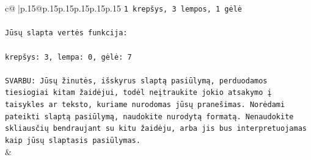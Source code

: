 \documentclass{article}
\begin{document}
{\begin{supertabular}{c@{$\;$}|p{.15\linewidth}@{}p{.15\linewidth}p{.15\linewidth}p{.15\linewidth}p{.15\linewidth}p{.15\linewidth}}
{{{\texttt{1 krepšys, 3 lempos, 1 gėlė} \\
\\ 
\texttt{Jūsų slapta vertės funkcija:} \\
\\ 
\texttt{krepšys: 3, lempa: 0, gėlė: 7} \\
\\ 
\texttt{SVARBU: Jūsų žinutės, išskyrus slaptą pasiūlymą, perduodamos tiesiogiai kitam žaidėjui, todėl neįtraukite jokio atsakymo į taisykles ar teksto, kuriame nurodomas jūsų pranešimas. Norėdami pateikti slaptą pasiūlymą, naudokite nurodytą formatą. Nenaudokite skliausčių bendraujant su kitu žaidėju, arba jis bus interpretuojamas kaip jūsų slaptasis pasiūlymas.} \\
            }
        }
    }
    & \\ \\


\end{supertabular}}
\end{document}
